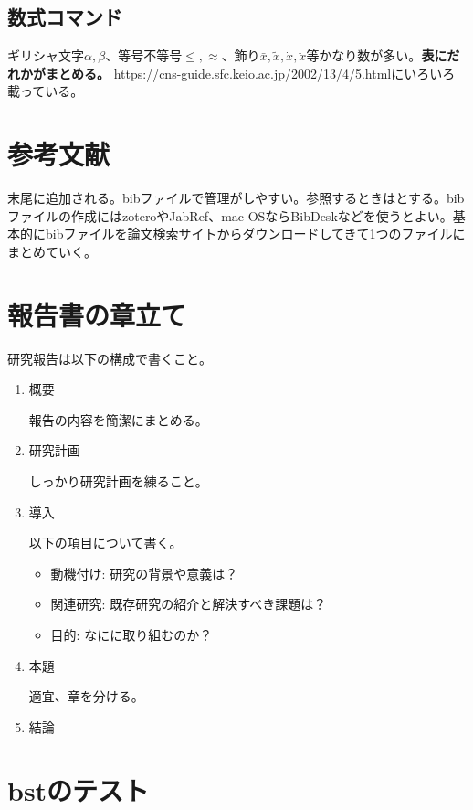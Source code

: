 \documentclass[uplatex,dvipdfmx,a4j,12pt,twocolumn]{jsarticle}
\begin{document}
\subsection{数式コマンド}
ギリシャ文字$\alpha,\beta$、等号不等号$\leq,\approx$、飾り$\bar{x},\tilde{x},\dot{x},\ddot{x}$等かなり数が多い。\textbf{表にだれかがまとめる。}
\url{https://cns-guide.sfc.keio.ac.jp/2002/13/4/5.html}にいろいろ載っている。

\section{参考文献}
末尾に追加される。bibファイルで管理がしやすい。参照するときは\cite{Fujiwara1984}とする。bibファイルの作成にはzoteroやJabRef、mac OSならBibDeskなどを使うとよい。基本的にbibファイルを論文検索サイトからダウンロードしてきて1つのファイルにまとめていく。


\section{報告書の章立て}
研究報告は以下の構成で書くこと。
\begin{enumerate}
    \item 概要

    報告の内容を簡潔にまとめる。

    \item 研究計画
    
    しっかり研究計画を練ること。

    \item 導入

    以下の項目について書く。

    \begin{itemize}
        \item 動機付け: 研究の背景や意義は？
        \item 関連研究: 既存研究の紹介と解決すべき課題は？
        \item 目的: なにに取り組むのか？
    \end{itemize}

    \item 本題

    適宜、章を分ける。

    \item 結論
    
\end{enumerate}

\section{bstのテスト}

\cite{Brown2022,EdBook2000,ENBookURL2023,Fujiwara1984,InCol2019,Kingma2015,Knuth1998,Landau1974,PythonWebsite,Sato2023,Smith2024,Tanaka2021,Yamada2024,WebJP2024}


\end{document}
